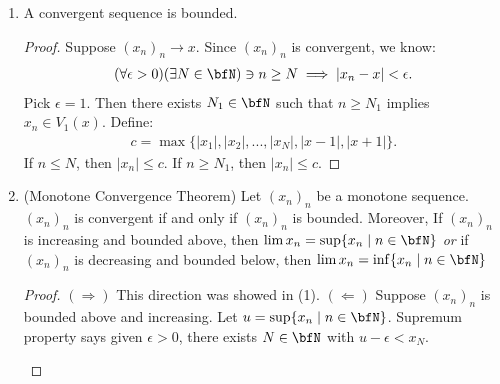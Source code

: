    \begin{enumerate}[label = (\arabic*)]
        \item A convergent sequence is bounded.
            {\color{red} \begin{proof}
                Suppose $(x_n)_n \rightarrow x$. Since $(x_n)_n$ is convergent, we know:
                    \begin{equation*}
                    \begin{split}
                        (\forall \epsilon > 0)(\exists N \in \bfN)\ni n \geq N \implies |x_n - x| < \epsilon.
                    \end{split}
                    \end{equation*}
                Pick $\epsilon = 1$. Then there exists $N_1 \in \bfN$ such that $n \geq N_1$ implies $x_n \in V_1(x)$. Define:
                    \begin{equation*}
                    \begin{split}
                        c = \max\{|x_1|,|x_2|,...,|x_N|,|x-1|,|x+1|\}.
                    \end{split}
                    \end{equation*}
                If $n \leq N$, then $|x_n| \leq c$. If $n \geq N_1$, then $|x_n| \leq c$.
            \end{proof}}

        \item (Monotone Convergence Theorem) Let $(x_n)_n$ be a monotone sequence. $(x_n)_n$ is convergent if and only if $(x_n)_n$ is bounded. Moreover, If $(x_n)_n$ is increasing and bounded above, then $\lim x_n = \sup\{x_n \mid n \in \bfN\}$ \textit{or} if $(x_n)_n$ is decreasing and bounded below, then $\lim x_n = \inf\{x_n \mid n \in \bfN\}$
            {\color{red} \begin{proof}
                $(\Rightarrow)$ This direction was showed in (1). $(\Leftarrow)$ Suppose $(x_n)_n$ is bounded above and increasing. Let $u = \sup\{x_n \mid n \in \bfN\}$. Supremum property says given $\epsilon > 0$, there exists $N \in \bfN$ with $u - \epsilon < x_N$.
                    \begin{center}
\end{center}
\end{proof}}
\end{enumerate}
